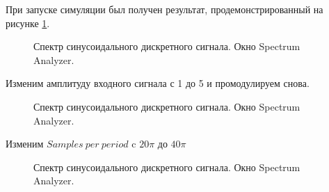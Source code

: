 \documentclass[a4paper,14pt]{extarticle}
\begin{document}
При запуске симуляции был получен результат, продемонстрированный на рисунке \ref{005}.

\begin{figure}[H]
\caption{Спектр синусоидального дискретного сигнала. Окно Spectrum Analyzer.}
\label{005}
\end{figure}

\newpage

Изменим амплитуду входного сигнала с 1 до 5 и промодулируем снова.

\begin{figure}[H]
\caption{Спектр синусоидального дискретного сигнала. Окно Spectrum Analyzer.}
\label{006}
\end{figure}

Изменим $Samples \ per \ period$ c $20\pi$ до $40\pi$

\begin{figure}[H]
\caption{Спектр синусоидального дискретного сигнала. Окно Spectrum Analyzer.}
\label{007}
\end{figure}
\end{document}
